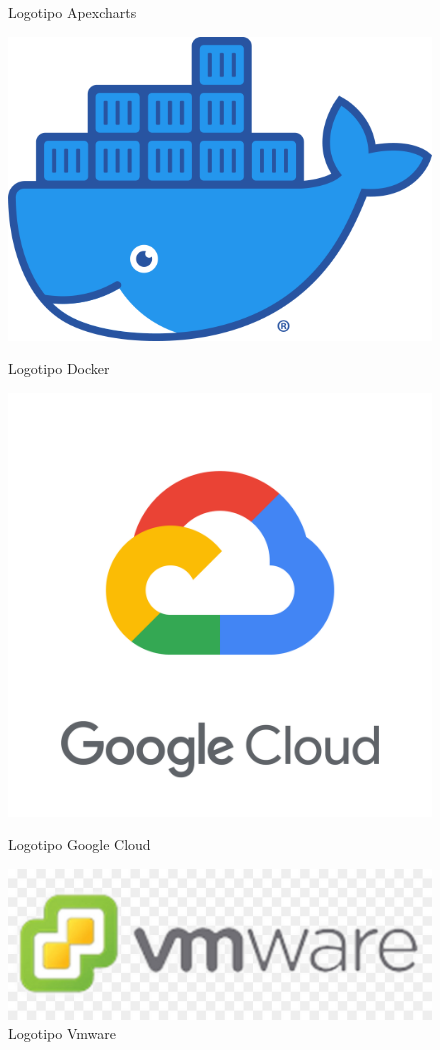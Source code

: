\documentclass[11pt,spanish,listoffigures,listoftables]{tfgetsinf}
\begin{document}
\begin{figure}[!htb]
    \caption{Logotipo Apexcharts}\label{fig:LogoApexcharts}
  \endminipage\hfill
   \includegraphics[width=\linewidth]{img/Moby-logo.png}
   \caption{Logotipo Docker}\label{fig:LogoDocker}
  \endminipage\hfill
     \includegraphics[width=\linewidth]{img/google_cloud_main.png}
     \caption{Logotipo Google Cloud}\label{fig:LogoGcloud}
  \endminipage\hfill
     \includegraphics[width=\linewidth]{img/logo-vmware.jpg}
     \caption{Logotipo Vmware}\label{fig:LogoVmware}
   \endminipage
\end{figure}
\end{document}
